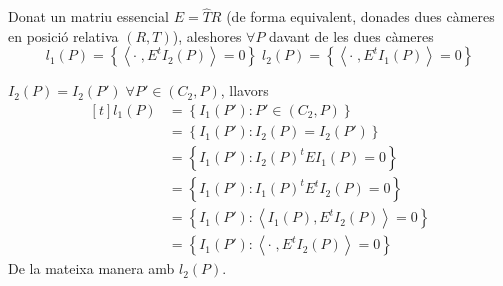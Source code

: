 \documentclass[../main.tex]{subfiles}
\begin{document}
	\begin{proposicio}
		Donat un matriu essencial $E = \hat{T}R$ (de forma equivalent, donades dues càmeres en posició relativa $(R,T)$), aleshores $\forall P$ davant de les dues càmeres
		\begin{displaymath}
			l_1(P) = \left\{\left\langle\cdot\;, E^tI_2(P)\right\rangle = 0\right\}\;
			l_2(P) = \left\{\left\langle\cdot\;, E^tI_1(P)\right\rangle = 0\right\}
		\end{displaymath}
	\end{proposicio}
	\begin{demostracio}
		$I_2(P) = I_2(P')\;\forall P' \in (C_2, P)$, llavors
		\begin{displaymath}
			\begin{aligned}[t]
				l_1(P) &= \left\{I_1(P') : P' \in (C_2, P)\right\}\\
			 	       &= \left\{I_1(P') : I_2(P) = I_2(P')\right\}\\
			 	       &= \left\{I_1(P') : I_2(P)^tEI_1(P)=0\right\}\\
			 	       &= \left\{I_1(P') : I_1(P)^tE^tI_2(P)=0\right\}\\
			 	       &= \left\{I_1(P') : \left\langle I_1(P),E^tI_2(P)\right\rangle=0\right\}\\
			 	       &= \left\{I_1(P') : \left\langle\cdot\;,E^tI_2(P)\right\rangle=0\right\}
			\end{aligned}
		\end{displaymath}
		De la mateixa manera amb $l_2(P)$.
	\end{demostracio}
\end{document}
